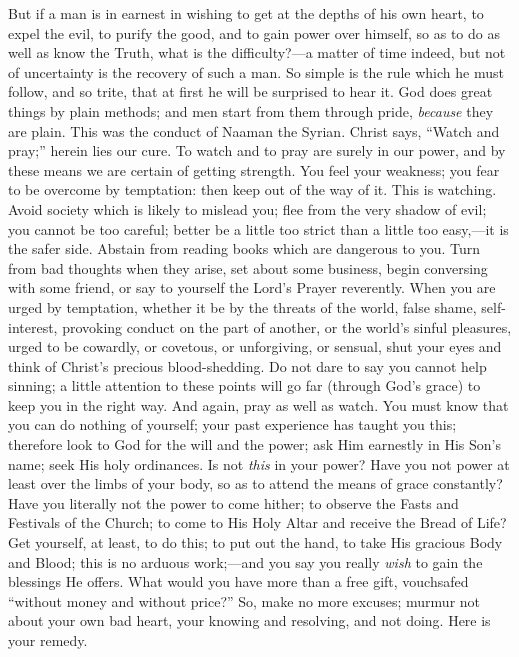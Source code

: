 But if a man is in earnest in wishing to get at the
depths of his own heart, to expel the evil, to purify the
good, and to gain power over himself, so as to do as well
as know the Truth, what is the difficulty?—a matter
of time indeed, but not of uncertainty is the recovery of
such a man. So simple is the rule which he must follow,
and so trite, that at first he will be surprised to hear
it. God does great things by plain methods; and men start
from them through pride, \emph{because} they are plain.
This was the conduct of Naaman the Syrian. Christ says,
``Watch and pray;'' herein lies our cure. To
watch and to pray are surely in our power, and by these
means we are certain of getting strength. You feel your weakness; you fear to be overcome by temptation: then
keep out of the way of it. This is watching. Avoid
society which is likely to mislead you; flee from the
very shadow of evil; you cannot be too careful; better be
a little too strict than a little too easy,—it is
the safer side. Abstain from reading books which are
dangerous to you. Turn from bad thoughts when they arise,
set about some business, begin conversing with some
friend, or say to yourself the Lord's Prayer reverently.
When you are urged by temptation, whether it be by the
threats of the world, false shame, self-interest,
provoking conduct on the part of another, or the world's
sinful pleasures, urged to be cowardly, or covetous, or
unforgiving, or sensual, shut your eyes and think of
Christ's precious blood-shedding. Do not dare to say you
cannot help sinning; a little attention to these points
will go far (through God's grace) to keep you in the
right way. And again, pray as well as watch. You must
know that you can do nothing of yourself; your past
experience has taught you this; therefore look to God for
the will and the power; ask Him earnestly in His Son's
name; seek His holy ordinances. Is not \emph{this} in
your power? Have you not power at least over the limbs of
your body, so as to attend the means of grace constantly?
Have you literally not the power to come hither; to
observe the Fasts and Festivals of the Church; to come to
His Holy Altar and receive the Bread of Life? Get
yourself, at least, to do this; to put out the hand, to
take His gracious Body and Blood; this is no arduous
work;—and you say you really \emph{wish} to gain
the blessings He offers. What would you have more than a
free gift, vouchsafed ``without money and without
price?'' So, make no more excuses; murmur not about
your own bad heart, your knowing and resolving, and not
doing. Here is your remedy.

